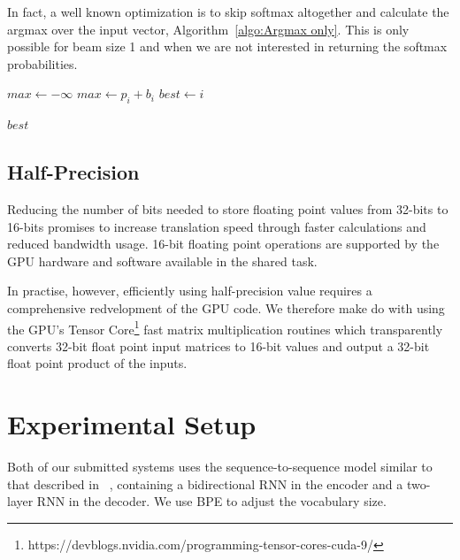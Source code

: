 \documentclass[11pt,a4paper]{article}
\begin{document}
In fact, a well known optimization is to skip softmax altogether and calculate the argmax over the input vector, Algorithm~\ref{algo:Argmax only}. This is only possible for beam size 1 and when we are not interested in returning the softmax probabilities.

\begin{algorithm}
\begin{algorithmic}

\State $max \gets - \infty$ 
    \State $max \gets p_i + b_i$
    \State $best \gets i$
  \EndIf
\EndFor

\Return $best$ 

\EndProcedure

\end{algorithmic}
\caption{Find 1-best only}
\label{algo:Argmax only}
\end{algorithm}


\subsection{Half-Precision}

Reducing the number of bits needed to store floating point values from 32-bits to 16-bits promises to increase translation speed through faster calculations and reduced bandwidth usage. 16-bit floating point operations are supported by the GPU hardware and software available in the shared task.

In practise, however, efficiently using half-precision value requires a comprehensive redvelopment of the GPU code. We therefore make do with using the GPU's Tensor Core\footnote{https://devblogs.nvidia.com/programming-tensor-cores-cuda-9/} fast matrix multiplication routines which transparently converts 32-bit float point input matrices to 16-bit values and output a 32-bit float point product of the inputs.

\section{Experimental Setup}
\label{sec:Experimental Setup}

Both of our submitted systems uses the sequence-to-sequence model similar to that described in ~\citet{sennrich-haddow-birch:2016:P16-12}, containing a bidirectional RNN in the encoder and a two-layer RNN in the decoder. We use BPE to adjust the vocabulary size.
\end{document}
